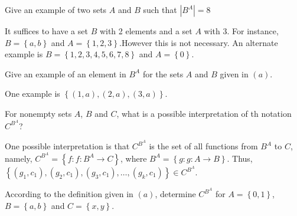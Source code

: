 \documentclass[12pt]{article}
\newenvironment{problem}[2][Problem]{\begin{trivlist} \item[\hskip \labelsep {\bfseries #1}\hskip \labelsep {\bfseries #2.}]}{\end{trivlist}}
\newenvironment{solution}[1][Solution]{\begin{trivlist} \item[\hskip \labelsep {\bfseries #1}]}{\end{trivlist}}
\begin{document}
    \begin{problem}{16}
      \begin{enumerate}[label=(\alph*)]
	\item Give an example of two sets $A$ and $B$ such that $|B^{A}|=8$
    \begin{solution}
      It suffices to have a set $B$ with 2 elements and a set $A$ with 3. For instance, $B=\left\{ a,b \right\}$ and $A=\left\{1,2,3 \right\}$.However this is not necessary. An alternate example is $B=\left\{1,2,3,4,5,6,7,8\right\}$ and $A=\left\{0\right\}$.
    \end{solution}
	\item Give an example of an element in $B^{A}$ for the sets $A$ and $B$ given in $(a)$.
    \begin{solution}
      One example is $\left\{(1,a),(2,a),(3,a)\right\}$.
    \end{solution}
    \end{enumerate}
    \end{problem}
    \begin{problem}{17}
      \begin{enumerate}[label=(\alph*)]
	\item For nonempty sets $A$, $B$ and $C$, what is a possible interpretation of th notation $C^{B^{A}}$?
    \begin{solution}
      One possible interpretation is that $C^{B^{A}}$ is the set of all functions from $B^{A}$ to $C$, namely, $C^{B^{A}}=\left\{f:f:B^{A}\to C\right\}$, where $B^{A}=\left\{g:g:A\to B \right\}$. Thus, $\left\{(g_{1},c_{1}),(g_{2},c_{1}),(g_{3},c_{1}),\dots,(g_{k},c_{1})\right\}\in C^{B^{A}}$.
    \end{solution}
	\item According to the definition given in $(a)$, determine $C^{B^{A}}$ for $A=\left\{ 0,1 \right\}$, $B=\left\{ a,b \right\}$ and $C=\left\{ x,y \right\}$. 
    \end{enumerate}
    \end{problem}
   
       
\end{document}
